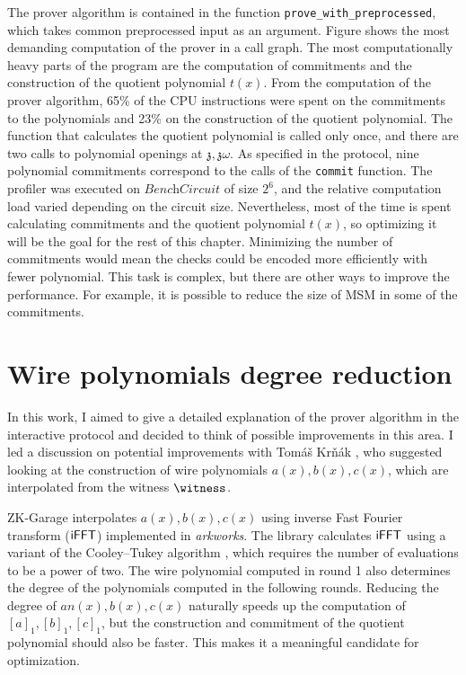 The prover algorithm is contained in the function \texttt{prove\_with\_preprocessed}, which takes common preprocessed input as an argument. Figure  shows the most demanding computation of the prover in a call graph. The most computationally heavy parts of the program are the computation of commitments and the construction of the quotient polynomial $t(x)$. From the computation of the prover algorithm, 65\% of the CPU instructions were spent on the commitments to the polynomials and 23\% on the construction of the quotient polynomial. The function that calculates the quotient polynomial is called only once, and there are two calls to polynomial openings at $\mathfrak{z}, \mathfrak{z}\omega$. As specified in the protocol, nine polynomial commitments correspond to the calls of the \texttt{commit} function. The profiler was executed on  $\textit{BenchCircuit}$ of size $2^{6}$, and the relative computation load varied depending on the circuit size. Nevertheless, most of the time is spent calculating commitments and the quotient polynomial $t(x)$, so optimizing it will be the goal for the rest of this chapter. Minimizing the number of commitments would mean the checks could be encoded more efficiently with fewer polynomial. This task is complex, but there are other ways to improve the performance. For example, it is possible to reduce the size of MSM in some of the commitments.

\section{Wire polynomials degree reduction}
In this work, I aimed to give a detailed explanation of the prover algorithm in the interactive protocol and decided to think of possible improvements in this area. I led a discussion on potential improvements with Tomáš Krňák \cite{tomas}, who suggested looking at the construction of wire polynomials $a(x), b(x), c(x)$, which are interpolated from the witness $\witness$. 

ZK-Garage interpolates $a(x), b(x), c(x)$ using inverse Fast Fourier transform ($\mathsf{iFFT}$) implemented in \textit{arkworks}. The library calculates $\mathsf{iFFT}$ using a variant of the Cooley–Tukey algorithm \cite{cooley-fft}, which requires the number of evaluations to be a power of two. The wire polynomial computed in round 1 also determines the degree of the polynomials computed in the following rounds. Reducing the degree of $ an (x), b(x), c(x)$ naturally speeds up the computation of $[a]_1, [b]_1, [c]_1$, but the construction and commitment of the quotient polynomial should also be faster. This makes it a meaningful candidate for optimization.

